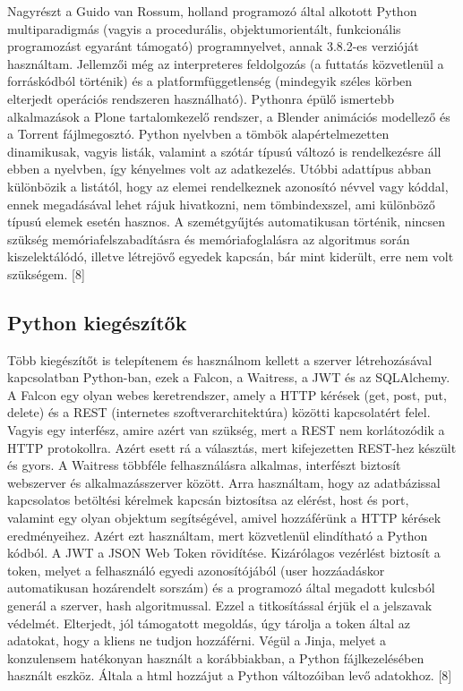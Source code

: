 \documentclass[12pt,a4paper]{report}
\begin{document}
Nagyrészt a Guido van Rossum, holland programozó által alkotott Python multiparadigmás 
(vagyis a procedurális, objektumorientált, funkcionális programozást egyaránt támogató)
programnyelvet, annak 3.8.2-es verzióját használtam. Jellemzői még az interpreteres 
feldolgozás (a futtatás közvetlenül a forráskódból történik) és a platformfüggetlenség 
(mindegyik széles körben elterjedt operációs rendszeren használható). Pythonra épülő
ismertebb alkalmazások a Plone tartalomkezelő rendszer, a Blender animációs modellező
és a Torrent fájlmegosztó. Python nyelvben a tömbök alapértelmezetten dinamikusak, vagyis
listák, valamint a szótár típusú változó is rendelkezésre áll ebben a nyelvben, így 
kényelmes volt az adatkezelés. Utóbbi adattípus abban különbözik a listától, hogy az 
elemei rendelkeznek azonosító névvel vagy kóddal, ennek megadásával lehet rájuk hivatkozni, 
nem tömbindexszel, ami különböző típusú elemek esetén hasznos. A szemétgyűjtés 
automatikusan történik, nincsen szükség memóriafelszabadításra és memóriafoglalásra az 
algoritmus során kiszelektálódó, illetve létrejövő egyedek kapcsán, bár mint kiderült,
erre nem volt szükségem. [8]

\subsection{Python kiegészítők}

Több kiegészítőt is telepítenem és használnom kellett a szerver létrehozásával kapcsolatban Python-ban, ezek a Falcon, a Waitress, a JWT és az SQLAlchemy. A Falcon egy olyan webes keretrendszer, amely a HTTP kérések (get, post, put, delete) és a REST (internetes szoftverarchitektúra) közötti  kapcsolatért felel. Vagyis egy interfész, amire azért van szükség, mert a REST nem korlátozódik a HTTP protokollra. Azért esett rá a választás, mert kifejezetten REST-hez készült és gyors. A Waitress többféle felhasználásra alkalmas, interfészt biztosít webszerver és alkalmazásszerver között. Arra használtam, hogy az adatbázissal kapcsolatos betöltési kérelmek kapcsán biztosítsa az elérést, host és port, valamint egy olyan objektum segítségével, amivel hozzáférünk a HTTP kérések eredményeihez. Azért ezt használtam, mert közvetlenül elindítható a Python kódból. A JWT a JSON Web Token rövidítése. Kizárólagos vezérlést biztosít a token, melyet a felhasználó egyedi azonosítójából (user hozzáadáskor automatikusan hozárendelt sorszám) és a programozó által megadott kulcsból generál a szerver, hash algoritmussal. Ezzel a titkosítással érjük el a jelszavak védelmét. Elterjedt, jól támogatott megoldás, úgy tárolja a token által az adatokat, hogy a kliens ne tudjon hozzáférni. Végül a Jinja, melyet a konzulensem hatékonyan használt a korábbiakban, a Python fájlkezelésében használt eszköz. Általa a html hozzájut a Python változóiban levő adatokhoz. [8]
\end{document}
